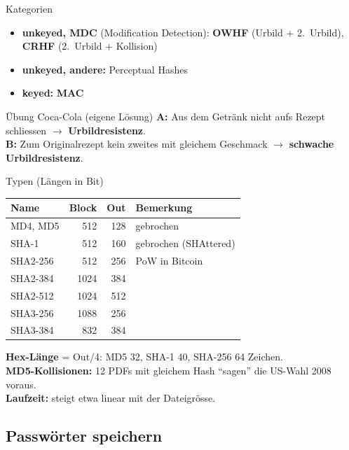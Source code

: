 \documentclass[a4paper, fontsize=7pt]{scrartcl}
\renewcommand*{\arraystretch}{1.5}  %
\begin{document}
\begin{mainbox}{Kategorien}
\begin{itemize}
    \item \textbf{unkeyed, MDC} (Modification Detection):
          \textbf{OWHF} (Urbild + 2.\ Urbild), \textbf{CRHF} (2.\ Urbild +
          Kollision)
    \item \textbf{unkeyed, andere:} Perceptual Hashes
    \item \textbf{keyed:} \textbf{MAC}
\end{itemize}
\end{mainbox}

\begin{subbox}{Übung Coca-Cola (eigene Lösung)}
\textbf{A:} Aus dem Getränk nicht aufs Rezept schliessen $\to$
\textbf{Urbildresistenz}.\\
\textbf{B:} Zum Originalrezept kein zweites mit gleichem Geschmack $\to$
\textbf{schwache Urbildresistenz}.
\end{subbox}

\begin{mainbox}{Typen (Längen in Bit)}
\renewcommand*{\arraystretch}{1.15}
\setlength{\tabcolsep}{3pt}
\begin{tabularx}{\linewidth}{@{}l|r|r|>{\raggedright\arraybackslash}X@{}}
\textbf{Name} & \textbf{Block} & \textbf{Out} & \textbf{Bemerkung} \\
\hline
MD4, MD5 & 512 & 128 & gebrochen \\
SHA-1 & 512 & 160 & gebrochen (SHAttered) \\
SHA2-256 & 512 & 256 & PoW in Bitcoin \\
SHA2-384 & 1024 & 384 & \\
SHA2-512 & 1024 & 512 & \\
SHA3-256 & 1088 & 256 & \\
SHA3-384 & 832 & 384 & \\
\end{tabularx}
\textbf{Hex-Länge} = Out/4: MD5 32, SHA-1 40, SHA-256 64 Zeichen.\\
\textbf{MD5-Kollisionen:} 12 PDFs mit gleichem Hash ``sagen'' die US-Wahl 2008
voraus.\\
\textbf{Laufzeit:} steigt etwa linear mit der Dateigrösse.
\end{mainbox}

\subsection{Passwörter speichern}
\end{document}
